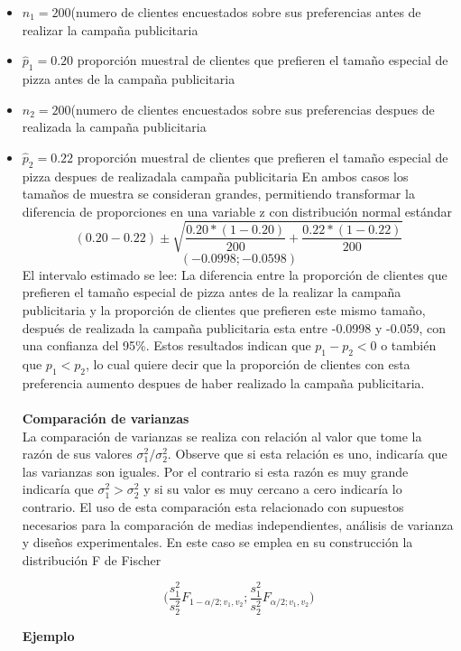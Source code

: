 \documentclass[base=hide,12pt]{elegantbook}
\begin{document}
\begin{itemize} 	
	\item $n_{1}=200$(numero de clientes encuestados sobre sus preferencias antes de realizar la campaña publicitaria
	\item $\widehat{p}_{1}=0.20$ proporción muestral de clientes que prefieren el tamaño especial de pizza antes de la campaña publicitaria
	\item $n_{2}=200$(numero de clientes encuestados sobre sus preferencias despues de realizada la campaña publicitaria
	\item $\widehat{p}_{2}=0.22$ proporción muestral de clientes que prefieren el tamaño especial de pizza despues de realizadala campaña publicitaria
	En ambos casos los tamaños de muestra se consideran grandes, permitiendo transformar la diferencia de proporciones en una variable z con distribución normal estándar
	$$(0.20-0.22) \pm \sqrt{\frac{0.20*(1-0.20)}{200}+\frac{0.22*(1-0.22)}{200}}$$
	$$(-0.0998 ; -0.0598) $$
	El intervalo estimado se lee: La diferencia entre la proporción de clientes que prefieren el tamaño especial de pizza antes de la realizar la campaña publicitaria y la proporción de clientes que prefieren este mismo tamaño, después de realizada la campaña publicitaria esta entre -0.0998 y -0.059, con una confianza del 95\%. Estos resultados indican que $p_{1}-p_{2}<0$ o también que $p_{1}<p_{2}$, lo cual quiere decir que la proporción de clientes con esta preferencia aumento despues de haber realizado la campaña publicitaria.\\ \\
	
\textcolor{col4}{\bf \large Comparación de varianzas}\\
	La comparación de varianzas se realiza con relación al valor que tome la razón de sus valores $\sigma^{2}_{1}/\sigma^{2}_{2}$. Observe que si esta relación es uno, indicaría que las varianzas son iguales. Por el contrario si esta razón es muy grande indicaría que $\sigma^{2}_{1}>\sigma^{2}_{2}$ y si su valor es muy cercano a cero indicaría lo contrario.
	El uso de esta comparación esta relacionado con supuestos necesarios para la comparación de medias independientes, análisis de varianza y diseños experimentales.
	En este caso se emplea en su construcción la distribución F de Fischer
	

			$$\Bigg(\frac{s_{1}^{2}}{s_{2}^{2}} F_{1-\alpha/2; v_{1},v_{2}} ; \frac{s_{1}^{2}}{s_{2}^{2}} F_{\alpha/2; v_{1},v_{2}} \Bigg) $$

	
\textcolor{col1}{\bf Ejemplo}\\	
\end{itemize}
\end{document}
